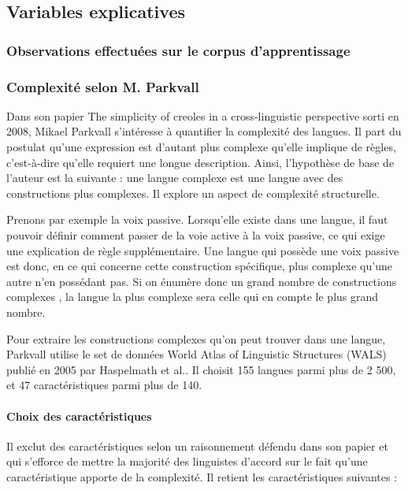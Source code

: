 \documentclass[a4paper, twoside]{article}
\begin{document}
    \subsection{Variables explicatives}

    \subsubsection{Observations effectuées sur le corpus d'apprentissage}
    \subsubsection{Complexité selon M. Parkvall}

    Dans son papier The simplicity of creoles in a cross-linguistic perspective sorti en 2008, Mikael Parkvall s’intéresse à quantifier la complexité des langues. Il part du postulat qu’une expression est d’autant plus complexe qu’elle implique de règles, c’est-à-dire qu’elle requiert une longue description. Ainsi, l'hypothèse de base de l’auteur est la suivante : une langue complexe est une langue avec des constructions plus complexes. Il explore un aspect de complexité structurelle.

    Prenons par exemple la voix passive. Lorsqu’elle existe dans une langue, il faut pouvoir définir comment passer de la voie active à la voix passive, ce qui exige une explication de règle supplémentaire. Une langue qui possède une voix passive est donc, en ce qui concerne cette construction spécifique, plus complexe qu’une autre n’en possédant pas. Si on énumère donc un grand nombre de \og constructions complexes \fg{}, la langue la plus complexe sera celle qui en compte le plus grand nombre.

    Pour extraire les \og constructions complexes \fg{} qu’on peut trouver dans une langue, Parkvall utilise le set de données World Atlas of Linguistic Structures (WALS) publié en 2005 par Haspelmath et al.. Il choisit 155 langues parmi plus de 2 500, et 47 caractéristiques parmi plus de 140.

    \paragraph{Choix des caractéristiques}

    Il exclut des caractéristiques selon un raisonnement défendu dans son papier et qui s’efforce de mettre la majorité des linguistes d’accord sur le fait qu’une caractéristique apporte de la complexité. Il retient les caractéristiques suivantes : \par
\end{document}
